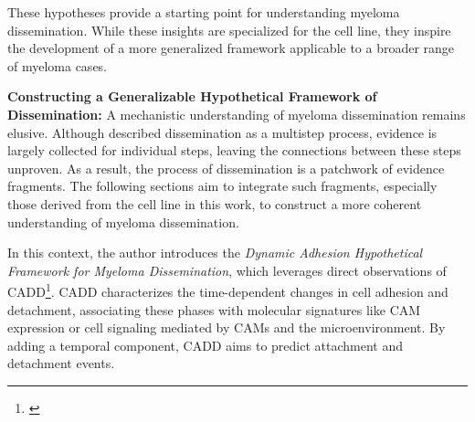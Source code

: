 These hypotheses   provide a starting
point for understanding myeloma dissemination. While these insights are
specialized for the \INA cell line, they inspire the development of a more
generalized framework applicable to a broader range of myeloma cases.

\textbf{Constructing a Generalizable Hypothetical Framework of Dissemination:}
A mechanistic understanding of myeloma dissemination remains elusive. Although
\citet{zeissigTumourDisseminationMultiple2020} described dissemination as a
multistep process, evidence is largely collected for individual steps, leaving
the connections between these steps unproven. As a result, the process of
dissemination is a patchwork of evidence fragments. The following sections aim
to integrate such fragments, especially those derived from the \INA cell line in
this work, to construct a more coherent understanding of myeloma dissemination.

In this context, the author introduces the \emph{Dynamic Adhesion Hypothetical Framework for
      Myeloma Dissemination}, which leverages direct observations of
\acf{CADD}\footnote{\footcadd\label{foot:cadd}}. \ac{CADD} characterizes
the time-dependent changes in cell adhesion and detachment, associating these
phases with molecular signatures like \ac{CAM} expression or cell signaling
mediated by \acp{CAM} and the microenvironment. By adding a temporal component,
\ac{CADD} aims to predict attachment and detachment events.



\newcommand{\caddadaptation}{ %
      \ac{CADD} is adapted in response to different microenvironments faced
      during dissemination %
}
\newcommand{\caddadaptationtitle}{ %
      \textit{Hypothesis 1}: \ac{CADD} is Adapted during Dissemination%
}%


\newcommand{\caddadaptibility}{ %
      High adaptability of \ac{CADD} is a hallmark of aggressive myeloma %
}%
\newcommand{\caddadaptabilitytitle}{ %
      \textit{Hypothesis 2}: High Adaptability of \ac{CADD} is a Hallmark of
      Aggressive Myeloma %
}%


\newcommand{\cadddiversity}{%
      \ac{CADD} is highly diverse within both patients and cell lines %
}%
\newcommand{\cadddiversitytitle}{ %
      \textit{Hypothesis 3}: \ac{CADD} is Highly Diverse Within both Patients
      and Cell Lines%
}%


\newcommand{\caddtrigger}{%
      Detachment is caused by multiple cues of varying nature, including
      external mechanical forces, cell division, loss of \ac{CAM} expression, or
      even pure chance. }%
\newcommand{\caddtriggertitle}{ %
      \textit{Hypothesis 4}: Detachment is Caused by Multiple Cues of Varying
      Nature %
}%


